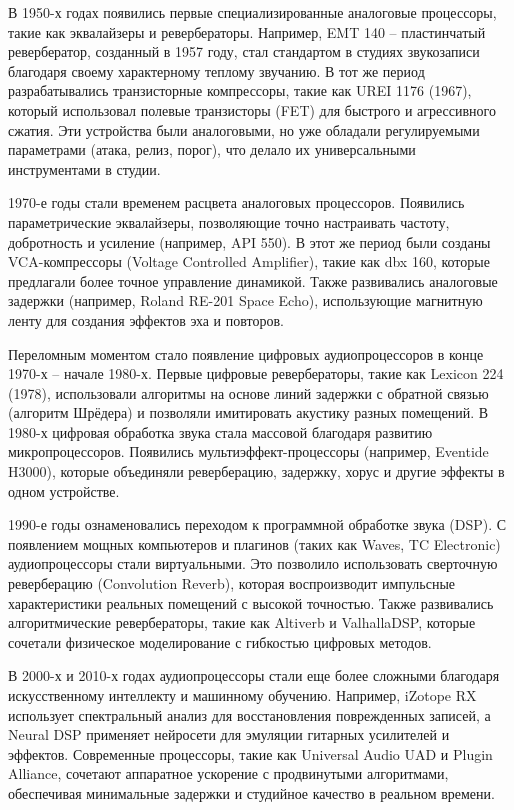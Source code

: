 В 1950-х годах появились первые специализированные аналоговые процессоры, такие как эквалайзеры и ревербераторы. Например, EMT 140 – пластинчатый ревербератор, созданный в 1957 году, стал стандартом в студиях звукозаписи благодаря своему характерному теплому звучанию. В тот же период разрабатывались транзисторные компрессоры, такие как UREI 1176 (1967), который использовал полевые транзисторы (FET) для быстрого и агрессивного сжатия. Эти устройства были аналоговыми, но уже обладали регулируемыми параметрами (атака, релиз, порог), что делало их универсальными инструментами в студии.

1970-е годы стали временем расцвета аналоговых процессоров. Появились параметрические эквалайзеры, позволяющие точно настраивать частоту, добротность и усиление (например, API 550). В этот же период были созданы VCA-компрессоры (Voltage Controlled Amplifier), такие как dbx 160, которые предлагали более точное управление динамикой. Также развивались аналоговые задержки (например, Roland RE-201 Space Echo), использующие магнитную ленту для создания эффектов эха и повторов.

Переломным моментом стало появление цифровых аудиопроцессоров в конце 1970-х – начале 1980-х. Первые цифровые ревербераторы, такие как Lexicon 224 (1978), использовали алгоритмы на основе линий задержки с обратной связью (алгоритм Шрёдера) и позволяли имитировать акустику разных помещений. В 1980-х цифровая обработка звука стала массовой благодаря развитию микропроцессоров. Появились мультиэффект-процессоры (например, Eventide H3000), которые объединяли реверберацию, задержку, хорус и другие эффекты в одном устройстве.

1990-е годы ознаменовались переходом к программной обработке звука (DSP). С появлением мощных компьютеров и плагинов (таких как Waves, TC Electronic) аудиопроцессоры стали виртуальными. Это позволило использовать сверточную реверберацию (Convolution Reverb), которая воспроизводит импульсные характеристики реальных помещений с высокой точностью. Также развивались алгоритмические ревербераторы, такие как Altiverb и ValhallaDSP, которые сочетали физическое моделирование с гибкостью цифровых методов.

В 2000-х и 2010-х годах аудиопроцессоры стали еще более сложными благодаря искусственному интеллекту и машинному обучению. Например, iZotope RX использует спектральный анализ для восстановления поврежденных записей, а Neural DSP применяет нейросети для эмуляции гитарных усилителей и эффектов. Современные процессоры, такие как Universal Audio UAD и Plugin Alliance, сочетают аппаратное ускорение с продвинутыми алгоритмами, обеспечивая минимальные задержки и студийное качество в реальном времени.

